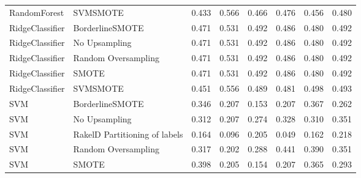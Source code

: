 \begin{tabular}{llllllll}
                   RandomForest &                      SVMSMOTE & 0.433 &                     0.566 &                 0.466 &                  0.476 &                                   0.456 &     0.480 \\
                RidgeClassifier &               BorderlineSMOTE & 0.471 &                     0.531 &                 0.492 &                  0.486 &                                   0.480 &     0.492 \\
                RidgeClassifier &                 No Upsampling & 0.471 &                     0.531 &                 0.492 &                  0.486 &                                   0.480 &     0.492 \\
                RidgeClassifier &           Random Oversampling & 0.471 &                     0.531 &                 0.492 &                  0.486 &                                   0.480 &     0.492 \\
                RidgeClassifier &                         SMOTE & 0.471 &                     0.531 &                 0.492 &                  0.486 &                                   0.480 &     0.492 \\
                RidgeClassifier &                      SVMSMOTE & 0.451 &                     0.556 &                 0.489 &                  0.481 &                                   0.498 &     0.493 \\
                            SVM &               BorderlineSMOTE & 0.346 &                     0.207 &                 0.153 &                  0.207 &                                   0.367 &     0.262 \\
                            SVM &                 No Upsampling & 0.312 &                     0.207 &                 0.274 &                  0.328 &                                   0.310 &     0.351 \\
                            SVM & RakelD Partitioning of labels & 0.164 &                     0.096 &                 0.205 &                  0.049 &                                   0.162 &     0.218 \\
                            SVM &           Random Oversampling & 0.317 &                     0.202 &                 0.288 &                  0.441 &                                   0.390 &     0.351 \\
                            SVM &                         SMOTE & 0.398 &                     0.205 &                 0.154 &                  0.207 &                                   0.365 &     0.293 \\

\end{tabular}
